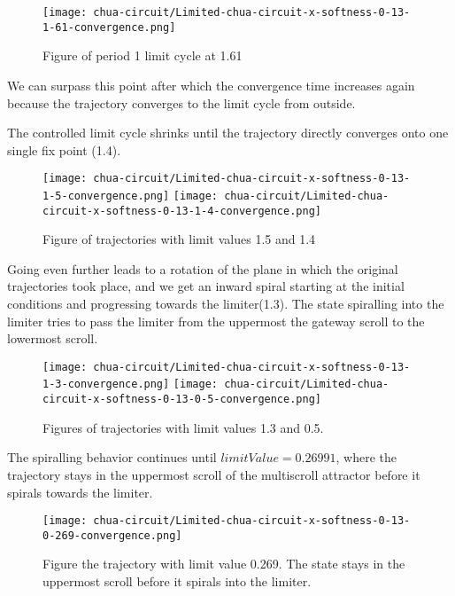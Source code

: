 \documentclass[main]{subfiles}
\begin{document}
\begin{figure}[H]
\centering
\texttt{[image: chua-circuit/Limited-chua-circuit-x-softness-0-13-1-61-convergence.png]}
\caption[Figure of period 1 limit cycle]{Figure of period 1 limit cycle at 1.61}
\label{figure:chaotictrajectories}
\end{figure}

We can surpass this point after which the convergence time increases again because the trajectory converges to the limit cycle from outside.


The controlled limit cycle shrinks until the trajectory directly converges onto one single fix point (1.4). 

\begin{figure}[H]
\centering
\texttt{[image: chua-circuit/Limited-chua-circuit-x-softness-0-13-1-5-convergence.png]}
\texttt{[image: chua-circuit/Limited-chua-circuit-x-softness-0-13-1-4-convergence.png]}
\caption[Figure of period 1 limit cycle]{Figure of trajectories with limit values 1.5 and 1.4}
\label{figure:chaotictrajectories}
\end{figure}

Going even further leads to a rotation of the plane in which the original trajectories took place, and we get an inward spiral starting at the initial conditions and progressing towards the limiter(1.3). The state spiralling into the limiter tries to pass the limiter from the uppermost the gateway scroll to the lowermost scroll.

\begin{figure}[H]
\centering
\texttt{[image: chua-circuit/Limited-chua-circuit-x-softness-0-13-1-3-convergence.png]}
\texttt{[image: chua-circuit/Limited-chua-circuit-x-softness-0-13-0-5-convergence.png]}
\caption[Figure of period 1 limit cycle]{Figures of trajectories with limit values 1.3 and 0.5.}
\label{figure:chaotictrajectories}
\end{figure}

The spiralling behavior continues until \(limitValue=0.26991\), where the trajectory stays in the uppermost scroll of the multiscroll attractor before it spirals towards the limiter.


\begin{figure}[H]
\centering
\texttt{[image: chua-circuit/Limited-chua-circuit-x-softness-0-13-0-269-convergence.png]}
\caption[Figure the trajectory with limit value 0.269.]{Figure the trajectory with limit value 0.269. The state stays in the uppermost scroll before it spirals into the limiter.}
\label{figure:chaotictrajectories}
\end{figure}
\end{document}
